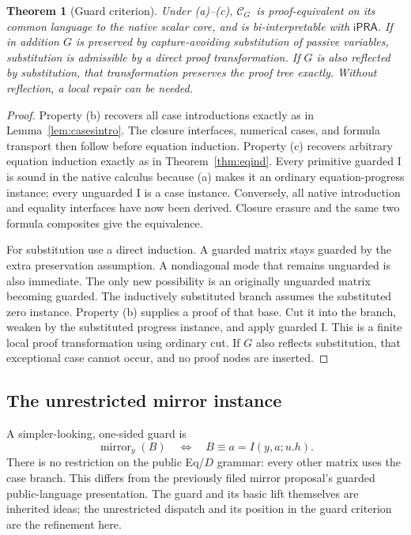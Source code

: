 \documentclass[11pt]{article}
\newtheorem{theorem}{Theorem}[section]
\theoremstyle{definition}\newtheorem{definition}[theorem]{Definition}
\theoremstyle{remark}\newtheorem{remark}[theorem]{Remark}
\newcommand{\ipra}{\ensuremath{\mathsf{iPRA}}}
\newcommand{\Cg}{\ensuremath{\mathcal C_G}}
\newcommand{\mirror}{\operatorname{mirror}}
\begin{document}
\begin{theorem}[Guard criterion]\label{thm:guard-criterion}
Under (a)--(c), \Cg\ is proof-equivalent on its common language to the native scalar core, and is bi-interpretable with \ipra. If in addition $G$ is preserved by capture-avoiding substitution of passive variables, substitution is admissible by a direct proof transformation. If $G$ is also reflected by substitution, that transformation preserves the proof tree exactly. Without reflection, a local repair can be needed.
\end{theorem}
\begin{proof}
Property (b) recovers all case introductions exactly as in Lemma~\ref{lem:casesintro}. The closure interfaces, numerical cases, and formula transport then follow before equation induction. Property (c) recovers arbitrary equation induction exactly as in Theorem~\ref{thm:eqind}. Every primitive guarded I is sound in the native calculus because (a) makes it an ordinary equation-progress instance; every unguarded I is a case instance. Conversely, all native introduction and equality interfaces have now been derived. Closure erasure and the same two formula composites give the equivalence.

For substitution use a direct induction. A guarded matrix stays guarded by the extra preservation assumption. A nondiagonal mode that remains unguarded is also immediate. The only new possibility is an originally unguarded matrix becoming guarded. The inductively substituted branch assumes the substituted zero instance. Property (b) supplies a proof of that base. Cut it into the branch, weaken by the substituted progress instance, and apply guarded I. This is a finite local proof transformation using ordinary cut. If $G$ also reflects substitution, that exceptional case cannot occur, and no proof nodes are inserted.
\end{proof}

\subsection{The unrestricted mirror instance}

A simpler-looking, one-sided guard is
\begin{equation}\label{eq:mirror}
 \mirror_y(B)\quad\Longleftrightarrow\quad
 B\equiv a=I(y,a;u.h).
\end{equation}
There is no restriction on the public Eq/$D$ grammar: every other matrix uses the case branch. This differs from the previously filed mirror proposal's guarded public-language presentation. The guard and its basic lift themselves are inherited ideas; the unrestricted dispatch and its position in the guard criterion are the refinement here.
\end{document}
